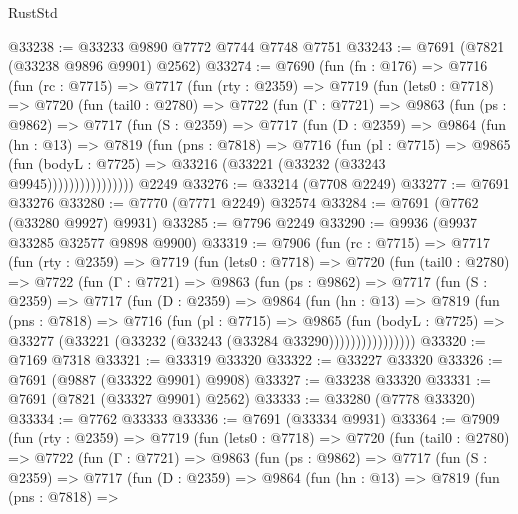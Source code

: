 \begin{lexlean}{RustStd}
\begin{coremodule}
@33238 := @33233 @9890 @7772 @7744 @7748 @7751
@33243 := @7691 (@7821 (@33238 @9896 @9901) @2562)
@33274 := @7690
    (fun (fn : @176) =>
    @7716
      (fun (rc : @7715) =>
      @7717
        (fun (rty : @2359) =>
        @7719
          (fun (lets0 : @7718) =>
          @7720
            (fun (tail0 : @2780) =>
            @7722
              (fun (Γ : @7721) =>
              @9863
                (fun (ps : @9862) =>
                @7717
                  (fun (S : @2359) =>
                  @7717
                    (fun (D : @2359) =>
                    @9864
                      (fun (hn : @13) =>
                      @7819
                        (fun (pns : @7818) =>
                        @7716
                          (fun (pl : @7715) =>
                          @9865
                            (fun (bodyL : @7725) =>
                            @33216 (@33221 (@33232 (@33243 @9945))))))))))))))))
    @2249
@33276 := @33214 (@7708 @2249)
@33277 := @7691 @33276
@33280 := @7770 (@7771 @2249) @32574
@33284 := @7691 (@7762 (@33280 @9927) @9931)
@33285 := @7796 @2249
@33290 := @9936 (@9937 @33285 @32577 @9898 @9900)
@33319 := @7906
    (fun (rc : @7715) =>
    @7717
      (fun (rty : @2359) =>
      @7719
        (fun (lets0 : @7718) =>
        @7720
          (fun (tail0 : @2780) =>
          @7722
            (fun (Γ : @7721) =>
            @9863
              (fun (ps : @9862) =>
              @7717
                (fun (S : @2359) =>
                @7717
                  (fun (D : @2359) =>
                  @9864
                    (fun (hn : @13) =>
                    @7819
                      (fun (pns : @7818) =>
                      @7716
                        (fun (pl : @7715) =>
                        @9865
                          (fun (bodyL : @7725) =>
                          @33277 (@33221 (@33232 (@33243 (@33284 @33290))))))))))))))))
@33320 := @7169 @7318
@33321 := @33319 @33320
@33322 := @33227 @33320
@33326 := @7691 (@9887 (@33322 @9901) @9908)
@33327 := @33238 @33320
@33331 := @7691 (@7821 (@33327 @9901) @2562)
@33333 := @33280 (@7778 @33320)
@33334 := @7762 @33333
@33336 := @7691 (@33334 @9931)
@33364 := @7909
    (fun (rty : @2359) =>
    @7719
      (fun (lets0 : @7718) =>
      @7720
        (fun (tail0 : @2780) =>
        @7722
          (fun (Γ : @7721) =>
          @9863
            (fun (ps : @9862) =>
            @7717
              (fun (S : @2359) =>
              @7717
                (fun (D : @2359) =>
                @9864
                  (fun (hn : @13) =>
                  @7819
                    (fun (pns : @7818) =>

\end{coremodule}
\end{lexlean}
